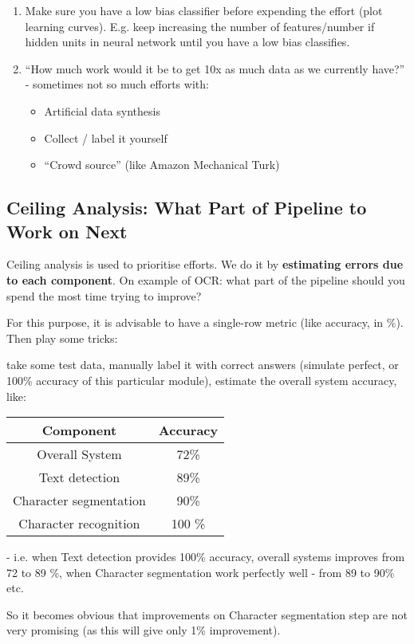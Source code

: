 \documentclass{scrartcl}
\begin{document}
\begin{enumerate}
\item Make sure you have a low bias classifier before expending the
  effort (plot learning curves). E.g. keep increasing the number of
  features/number if hidden units in neural network until you have a
  low bias classifies.
\item ``How much work would it be to get 10x as much data as we
  currently have?'' - sometimes not so much efforts with:
  \begin{itemize}
  \item Artificial data synthesis
  \item Collect / label it yourself
  \item ``Crowd source'' (like Amazon Mechanical Turk)
  \end{itemize}
\end{enumerate}

\subsection{Ceiling Analysis: What Part of Pipeline to Work on Next}
\label{sec:18-4}

Ceiling analysis is used to prioritise efforts. We do it by {\bf
  estimating errors due to each component}. On example of OCR: what
part of the pipeline should you spend the most time trying to improve? 

For this purpose, it is advisable to have a single-row metric (like
accuracy, in \%). Then play some tricks: 

take some test data, manually label it with correct answers (simulate
perfect, or 100\% accuracy of this particular module), estimate the
overall system accuracy, like:

\begin{tabular}{c|c}
  \textbf{Component} & \textbf{Accuracy} \\
  \hline
  Overall System & 72\% \\
  Text detection & 89\% \\
  Character segmentation & 90\% \\
  Character recognition & 100 \%
\end{tabular}
- i.e. when Text detection provides 100\% accuracy, overall systems
improves from 72 to 89 \%, when Character segmentation work perfectly
well - from 89 to 90\% etc.

So it becomes obvious that improvements on Character segmentation step
are not very promising (as this will give only 1\% improvement).
\end{document}
